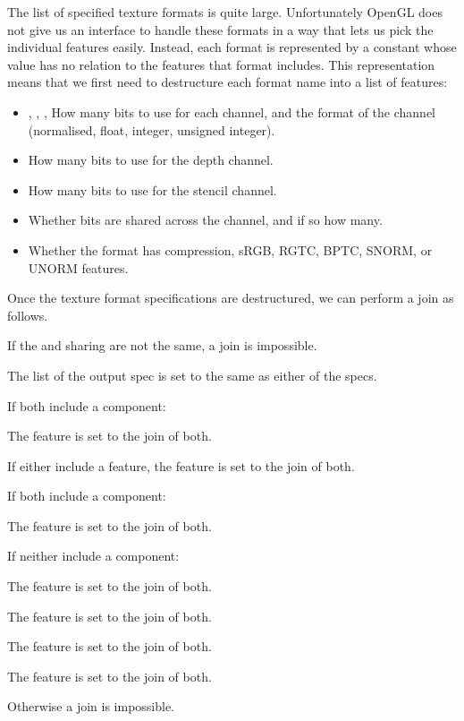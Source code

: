 \documentclass[format=sigconf]{acmart}
\begin{document}
The list of specified texture formats is quite large\cite{texinternalformat}. Unfortunately OpenGL does not give us an interface to handle these formats in a way that lets us pick the individual features easily. Instead, each format is represented by a constant whose value has no relation to the features that format includes. This representation means that we first need to destructure each format name into a list of features: \\

\begin{itemize}
\item {}, , ,  How many bits to use for each channel, and the format of the channel (normalised, float, integer, unsigned integer).
\item {} How many bits to use for the depth channel.
\item {} How many bits to use for the stencil channel.
\item {} Whether bits are shared across the channel, and if so how many.
\item {} Whether the format has compression, sRGB, RGTC, BPTC, SNORM, or UNORM features.
\end{itemize}

Once the texture format specifications are destructured, we can perform a join as follows.

\begin{step}
\item If the  and sharing are not the same, a join is impossible.
\item The  list of the output spec is set to the same as either of the specs.
\item If both include a  component:
  \begin{step}
  \item The  feature is set to the join of both.
  \item If either include a  feature, the  feature is set to the join of both.
  \end{step}
\item If both include a  component:
  \begin{step}
  \item The  feature is set to the join of both.
  \end{step}
\item If neither include a  component:
  \begin{step}
  \item The  feature is set to the join of both.
  \item The  feature is set to the join of both.
  \item The  feature is set to the join of both.
  \item The  feature is set to the join of both.
  \end{step}
\item Otherwise a join is impossible.
\end{step}
\end{document}
